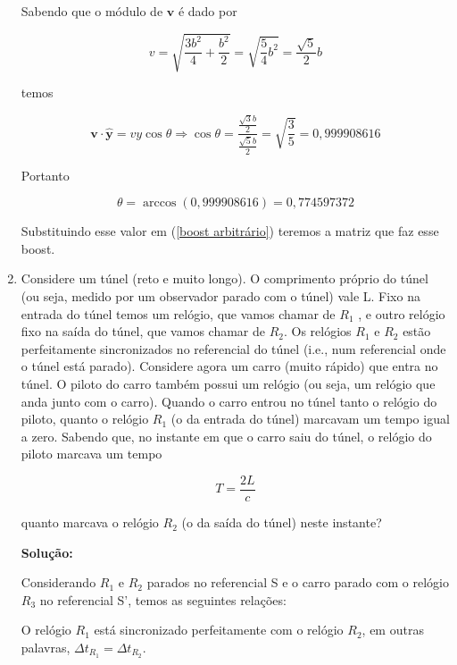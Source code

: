\documentclass[10pt,a4paper]{article}
\begin{document}
\begin{enumerate}
Sabendo que o módulo de $\mathbf{v}$ é dado por 

\begin{equation}
v = \sqrt{\frac{3b^2}{4}+\frac{b^2}{2}} = \sqrt{\frac{5}{4}b^2} = \frac{\sqrt{5}}{2}b
\end{equation}

temos

\begin{equation}
\mathbf{v}\cdot\mathbf{\hat{y}} = vy\cos\theta \Rightarrow \cos\theta = \frac{\frac{\sqrt{3}b}{2}}{\frac{\sqrt{5}b}{2}} = \sqrt{\frac{3}{5}} = 0,999908616 
\end{equation}

Portanto 

\begin{equation}
\theta = \arccos(0,999908616) = 0,774597372
\end{equation}
	
	
Substituindo esse valor em (\ref{boost arbitrário}) teremos a matriz que faz esse boost.
	\item Considere um túnel (reto e muito longo). O comprimento próprio do túnel (ou seja, medido por um observador parado com o túnel) vale L. Fixo na entrada do túnel temos um relógio, que vamos chamar de $R_1$ , e outro relógio fixo na saída do túnel, que vamos chamar de $R_2$. Os relógios $R_1$ e $R_2$ estão perfeitamente sincronizados no referencial do túnel (i.e., num referencial onde o túnel está parado). Considere agora um carro (muito rápido) que entra no túnel. O piloto do carro também possui um relógio (ou seja, um relógio que anda junto com o carro). Quando o carro entrou no túnel tanto o relógio do piloto, quanto o relógio $R_1$ (o da entrada do túnel) marcavam um tempo igual a zero. Sabendo que, no instante em que o carro saiu do túnel, o relógio do piloto marcava um tempo
	
	\begin{equation}
	T = \frac{2L}{c}
	\end{equation}
	
	quanto marcava o relógio $R_2$ (o da saída do túnel) neste instante?
	
	\textbf{Solução:}
	
	Considerando $ R_1 $ e $ R_2 $ parados no referencial S e o carro parado com o relógio $ R_3 $ no referencial S', temos as seguintes relações:
	
	O relógio $ R_1 $ está sincronizado perfeitamente com o relógio $ R_2 $, em outras palavras, $ \Delta t_{R_1} = \Delta t_{R_2}$.
	

\end{enumerate}
\end{document}
